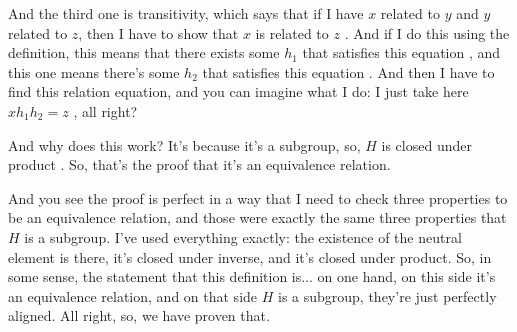 \begin{speech}[00:17:28 - 00:19:02]
And the third one is transitivity, which says that if I have $x$ related to $y$ and $y$ related to $z$, then I have to show that $x$ is related to $z$ . And if I do this using the definition, this means that there exists some $h_1$ that satisfies this equation , and this one means there's some $h_2$ that satisfies this equation . And then I have to find this relation equation, and you can imagine what I do: I just take here $x h_1 h_2 = z$ , all right?

And why does this work? It's because it's a subgroup, so, $H$ is closed under product . So, that's the proof that it's an equivalence relation.

And you see the proof is perfect in a way that I need to check three properties to be an equivalence relation, and those were exactly the same three properties that $H$ is a subgroup. I've used everything exactly: the existence of the neutral element is there, it's closed under inverse, and it's closed under product. So, in some sense, the statement that this definition is... on one hand, on this side it's an equivalence relation, and on that side $H$ is a subgroup, they're just perfectly aligned. All right, so, we have proven that.
\end{speech}

